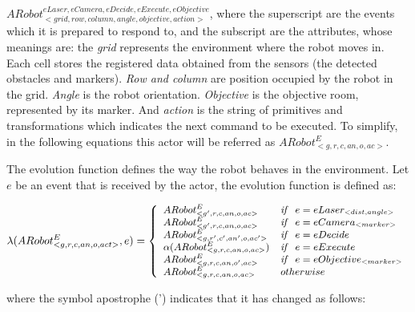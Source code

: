 \documentclass{svmult}
\begin{document}
$ARobot^{eLaser, eCamera, eDecide, eExecute, eObjective}_{<grid, row, column, angle, objective, action>}$, 
where the superscript are the events which it is prepared to respond to, and the subscript are the attributes, whose meanings are: 
the \textit{grid} represents the environment where the robot moves in. 
	Each cell stores the registered data obtained from the sensors (the detected obstacles and markers).
\textit{Row and column} are position occupied by the robot in the grid.
\textit{Angle} is the robot orientation.
\textit{Objective} is the objective room, represented by its marker.
And \textit{action} is the string of primitives and transformations which 
	indicates the next command to be executed.
To simplify, in the following equations this actor will be referred as $ARobot^{E}_{<g, r, c, an, o, ac>}$.

The evolution function defines the way the robot behaves in the environment. Let $e$ be an event that is received by the actor, the evolution function is defined as:

\vspace{-0.4cm}
\begin{equation}
	\begin{small}
	\lambda (ARobot^{E}_{<g, r, c, an, o, act>}, e)= 
    \left\{
    \begin{array}{ll}
		ARobot^{E}_{<g', r, c, an, o, ac>} & \mathit{if}  \ \ e = eLaser_{<dist,angle>} \\ 
        ARobot^{E}_{<g', r, c, an, o, ac>} & \mathit{if}  \ \ e = eCamera_{<marker>} \\ 
        ARobot^{E}_{<g, r', c', an', o, ac'>} & \mathit{if}  \ \ e = eDecide \\ 
        \alpha(ARobot^{E}_{<g, r, c, an, o, ac>}) & \mathit{if}  \ \ e = eExecute \\ 
        ARobot^{E}_{<g, r, c, an, o', ac>} & \mathit{if}  \ \ e = eObjective_{<marker>} \\ 
        ARobot^{E}_{<g, r, c, an, o, ac>} & otherwise
    \end{array}\right.    
	\end{small}
\end{equation}

where the symbol apostrophe (') indicates that it has changed as follows:
\end{document}
